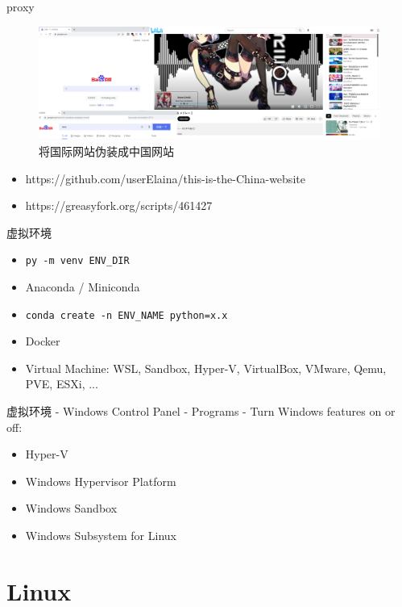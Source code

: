 \documentclass{beamer}
\begin{document}
\begin{frame}{proxy}
    \begin{figure}[c]
        \centering
        \includegraphics[height=.5\textheight]{pic/gf.png}
        \caption{将国际网站伪装成中国网站}
    \end{figure}
    \begin{itemize}
        \item https://github.com/userElaina/this-is-the-China-website
        \item https://greasyfork.org/scripts/461427
    \end{itemize}
\end{frame}

\begin{frame}{虚拟环境}
    \begin{itemize}
        \item {\tt{py -m venv ENV\_DIR}}
        \item Anaconda / Miniconda
        \item {\tt{conda create -n ENV\_NAME python=x.x}}
        \item Docker
        \item Virtual Machine: WSL, Sandbox, Hyper-V, VirtualBox, VMware, Qemu, PVE, ESXi, ...
    \end{itemize}
\end{frame}

\begin{frame}{虚拟环境 - Windows}
    Control Panel - Programs - Turn Windows features on or off:
    \begin{itemize}
        \item Hyper-V
        \item Windows Hypervisor Platform
        \item Windows Sandbox
        \item Windows Subsystem for Linux
    \end{itemize}
\end{frame}

\section{Linux}
\end{document}
